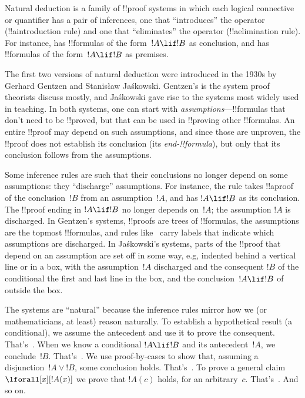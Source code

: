 \documentclass[../../../include/open-logic-section]{subfiles}
\begin{document}


Natural deduction is a family of !!{proof} systems in which each
logical connective or quantifier has a pair of inferences, one that
``introduces'' the operator (!!a{introduction} rule) and one that
``eliminates'' the operator (!!a{elimination} rule). For instance,
\Intro{\lif} has !!{formula}s of the form~$!A \lif !B$ as conclusion,
and \Elim{\lif} has !!{formula}s of the form~$!A \lif !B$ as premises.

The first two versions of natural deduction were introduced in the
1930s by Gerhard Gentzen and Stanisław Jaśkowski. Gentzen's is the
system proof theorists discuss mostly, and Jaśkowski gave rise to the
systems most widely used in teaching. In both systems, one can start
with \emph{assumptions}---!!{formula}s that don't need to be
!!{prove}d, but that can be used in !!{proving} other !!{formula}s.
An entire !!{proof} may depend on such assumptions, and since those
are unproven, the !!{proof} does not establish its conclusion (its
\emph{end-!!{formula}}), but only that its conclusion follows from the
assumptions.

Some inference rules are such that their conclusions no longer depend
on some assumptions: they ``discharge'' assumptions. For instance, the
\Intro{\lif} rule takes !!a{proof} of the conclusion~$!B$ from an
assumption~$!A$, and has $!A \lif !B$ as its conclusion. The !!{proof}
ending in $!A \lif !B$ no longer depends on~$!A$; the assumption $!A$
is discharged. In Gentzen's systems, !!{proof}s are trees of
!!{formula}s, the assumptions are the topmost !!{formula}s, and rules
like~\Intro{\lif} carry labels that indicate which assumptions are
discharged. In Jaśkowski's systems, parts of the !!{proof} that depend
on an assumption are set off in some way, e.g, indented behind a
vertical line or in a box, with the assumption~$!A$ discharged and the
consequent $!B$ of the conditional the first and last line in the box,
and the conclusion~$!A \lif !B$ of \Intro{\lif} outside the box.

The systems are ``natural'' because the inference rules mirror how we
(or mathematicians, at least) reason naturally. To establish a
hypothetical result (a conditional), we assume the antecedent and use
it to prove the consequent. That's~\Intro{\lif}. When we know a
conditional $!A \lif !B$ and its antecedent~$!A$, we conclude~$!B$.
That's~\Elim{\lif}. We use proof-by-cases to show that, assuming a
disjunction~$!A \lor !B$, some conclusion holds. That's~\Elim{\lor}.
To prove a general claim~$\lforall[x][!A(x)]$ we prove that $!A(c)$
holds, for an arbitrary~$c$. That's~\Intro{\lforall}. And so on.
\end{document}
